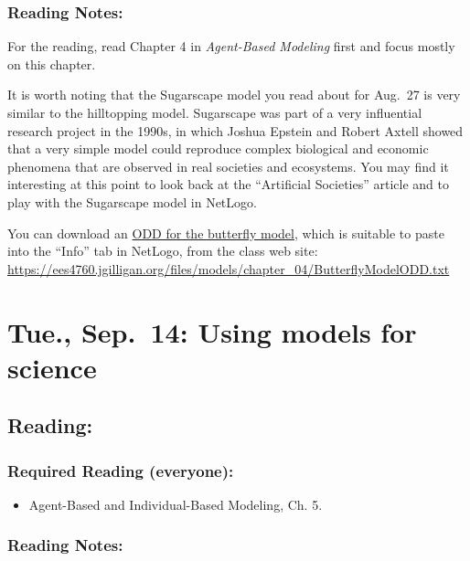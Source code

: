 \documentclass[
]{article}
\providecommand{\tightlist}{%
  \setlength{\itemsep}{0pt}\setlength{\parskip}{0pt}}
\begin{document}
\hypertarget{reading-notes-3}{%
\subsubsection{Reading Notes:}\label{reading-notes-3}}

For the reading, read Chapter 4 in \emph{Agent-Based Modeling} first and
focus mostly on this chapter.

It is worth noting that the Sugarscape model you read about for Aug.~27
is very similar to the hilltopping model. Sugarscape was part of a very
influential research project in the 1990s, in which Joshua Epstein and
Robert Axtell showed that a very simple model could reproduce complex
biological and economic phenomena that are observed in real societies
and ecosystems. You may find it interesting at this point to look back
at the ``Artificial Societies'' article and to play with the Sugarscape
model in NetLogo.

You can download an
\href{/files/models/chapter_04/ButterflyModelODD.txt}{ODD for the
butterfly model}, which is suitable to paste into the ``Info'' tab in
NetLogo, from the class web site:
\url{https://ees4760.jgilligan.org/files/models/chapter_04/ButterflyModelODD.txt}

\hypertarget{tue.-sep.-14-using-models-for-science}{%
\section{Tue., Sep.~14: Using models for
science}\label{tue.-sep.-14-using-models-for-science}}

\hypertarget{reading-5}{%
\subsection{Reading:}\label{reading-5}}

\hypertarget{required-reading-everyone-4}{%
\subsubsection{Required Reading
(everyone):}\label{required-reading-everyone-4}}

\begin{itemize}
\tightlist
\item
  Agent-Based and Individual-Based Modeling, Ch. 5.
\end{itemize}

\hypertarget{reading-notes-4}{%
\subsubsection{Reading Notes:}\label{reading-notes-4}}
\end{document}
